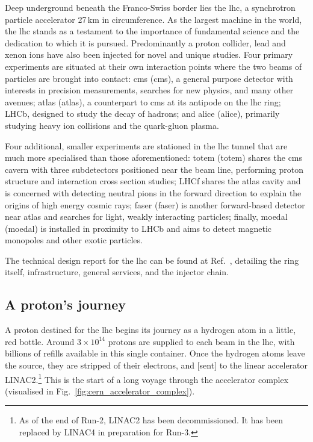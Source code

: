 Deep underground beneath the Franco-Swiss border lies the \acrfull{lhc}, a synchrotron particle accelerator 27\,km in circumference. As the largest machine in the world, the \acrshort{lhc} stands as a testament to the importance of fundamental science and the dedication to which it is pursued. Predominantly a proton collider, lead and xenon ions have also been injected for novel and unique studies. Four primary experiments are situated at their own interaction points where the two beams of particles are brought into contact: \acrshort{cms} (\acrlong{cms}), a general purpose detector with interests in precision measurements, searches for new physics, and many other avenues; \acrshort{atlas} (\acrlong{atlas}), a counterpart to \acrshort{cms} at its antipode on the \acrshort{lhc} ring; LHCb, designed to study the decay of \PB hadrons; and \acrshort{alice} (\acrlong{alice}), primarily studying heavy ion collisions and the quark-gluon plasma.

Four additional, smaller experiments are stationed in the \acrshort{lhc} tunnel that are much more specialised than those aforementioned: \acrshort{totem} (\acrlong{totem}) shares the \acrshort{cms} cavern with three subdetectors positioned near the beam line, performing proton structure and interaction cross section studies; LHCf shares the \acrshort{atlas} cavity and is concerned with detecting neutral pions in the forward direction to explain the origins of high energy cosmic rays; \acrshort{faser} (\acrlong{faser}) is another forward-based detector near \acrshort{atlas} and searches for light, weakly interacting particles; finally, \acrshort{moedal} (\acrlong{moedal}) is installed in proximity to LHCb and aims to detect magnetic monopoles and other exotic particles.

The technical design report for the \acrshort{lhc} can be found at Ref.~, detailing the ring itself, infrastructure, general services, and the injector chain.




\subsection{A proton's journey}  %
\label{subsec:protons_journey}

A proton destined for the \acrshort{lhc} begins its journey as a hydrogen atom in a little, red bottle. Around $\text{3} \times \text{10}^{\text{14}}$ protons are supplied to each beam in the \acrshort{lhc}, with billions of refills available in this single container. Once the hydrogen atoms leave the source, they are stripped of their electrons, and [sent] to the linear accelerator LINAC2.\footnote{As of the end of Run-2, LINAC2 has been decommissioned. It has been replaced by LINAC4 in preparation for Run-3.} This is the start of a long voyage through the accelerator complex (visualised in Fig.~\ref{fig:cern_accelerator_complex}).

